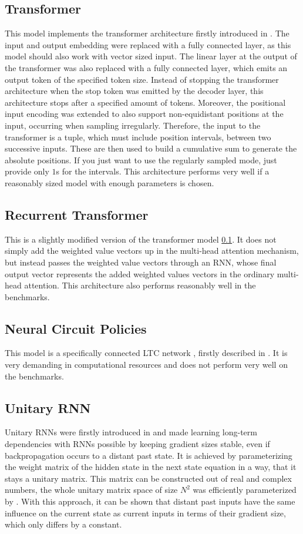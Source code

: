 \documentclass[draft,final]{vutinfth} %
\begin{document}
\subsection{Transformer} \label{Transformer}
This model implements the transformer architecture firstly introduced in \cite{Transformer}. The input and output embedding were replaced with a fully connected layer, as this model should also work with vector sized input. 
The linear layer at the output of the transformer was also replaced with a fully connected layer, which emits an output token of the specified token size.
Instead of stopping the transformer architecture when the stop token was emitted by the decoder layer, this architecture stops after a specified amount of tokens.
Moreover, the positional input encoding was extended to also support non-equidistant positions at the input, occurring when sampling irregularly.
Therefore, the input to the transformer is a tuple, which must include position intervals, between two successive inputs.
These are then used to build a cumulative sum to generate the absolute positions. If you just want to use the regularly sampled mode, just provide only $1$s for the intervals.
This architecture performs very well if a reasonably sized model with enough parameters is chosen.
\subsection{Recurrent Transformer} \label{Recurrent Transformer}
This is a slightly modified version of the transformer model \ref{Transformer}. 
It does not simply add the weighted value vectors up in the multi-head attention mechanism, but instead passes the weighted value vectors through an RNN, whose final output vector represents the added weighted values vectors in the ordinary multi-head attention.
This architecture also performs reasonably well in the benchmarks.
\subsection{Neural Circuit Policies} \label{Neural Circuit Policies}
This model is a specifically connected LTC network \cite{LTCNetworks}, firstly described in \cite{NCP}.
It is very demanding in computational resources and does not perform very well on the benchmarks.
\subsection{Unitary RNN} \label{Unitary RNN}
Unitary RNNs were firstly introduced in \cite{UnitaryRNNs} and made learning long-term dependencies with RNNs possible by keeping gradient sizes stable, even if backpropagation occurs to a distant past state. 
It is achieved by parameterizing the weight matrix of the hidden state in the next state equation in a way, that it stays a unitary matrix. 
This matrix can be constructed out of real and complex numbers, the whole unitary matrix space of size $N^2$ was efficiently parameterized by \cite{EfficientUnitaryRNNs}.
With this approach, it can be shown that distant past inputs have the same influence on the current state as current inputs in terms of their gradient size, which only differs by a constant.
\end{document}
